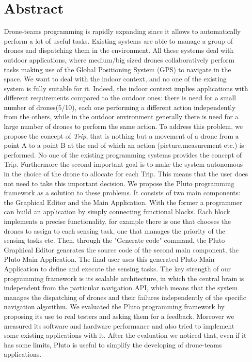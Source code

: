 \chapter*{Abstract}


Drone-teams programming is rapidly expanding since it allows to automatically perform a lot of useful tasks.
Existing systems are able to manage a group of drones and dispatching them in the environment. 
All these systems deal with outdoor applications, where medium/big sized drones collaboratively perform tasks making use of the Global Positioning System (GPS) to navigate in the space.
We want to deal with the indoor context, and no one of the existing system is fully suitable for it.
Indeed, the indoor context implies applications with different requirements compared to the outdoor ones:
there is need for a small number of drones(5/10), each one performing a different action independently from the others, while in the outdoor environment generally there is need for a large number of drones to perform the same action.
To address this problem, we propose the concept of \textit{Trip}, that is nothing but a movement of a drone from a point A to a point B at the end of which an action (picture,measurement etc.) is performed. 
No one of the existing programming systems provides the concept of Trip.
Furthermore the second important goal is to make the system autonomous in the choice of the drone to allocate for each Trip. 
This means that the user does not need to take this important decision.
We propose the Pluto programming framework as a solution to these problems. 
It consists of two main components: the Graphical Editor and the Main Application.
With the former a programmer can build an application by simply connecting functional blocks.
Each block implements a precise functionality, for example there is one that chooses the drones to assign to each sensing task, one that manages the priority of the sensing tasks etc.
Then, through the "Generate code" command, the Pluto Graphical Editor generates the source code of the second main component, the Pluto Main Application.
The final user uses this generated Pluto Main Application to define and execute the sensing tasks.
The key strength of our programming framework is its scalable architecture, in which the central brain is independent from the particular navigation API, which means that the system manages the dispatching of drones and their failures independently of the specific navigation algorithm.
We evaluated the Pluto programming framework by proposing its use to real testers and asking them for a feedback. 
Moreover we measured its software and hardware performance and also tried to implement some existing applications with it.
After the evaluation we noticed that, even if it has some limits, Pluto is useful to simplify the developing of drone-teams applications.